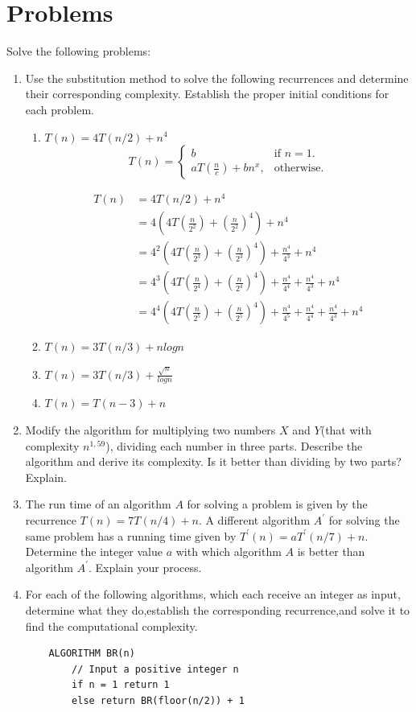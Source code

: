 \documentclass{article}
\begin{document}
\section{Problems}
Solve the following problems:
\begin{enumerate}
    \item Use  the  substitution  method  to  solve  the  following  recurrences  and  determine  their  corresponding complexity. Establish the proper initial conditions for each problem.
    \begin{enumerate}
        \item $T(n) = 4T(n/2) +n^4$
        \begin{equation*}
            T(n)=\begin{cases}
              b & \text{if $n = 1$}.\\
              aT(\frac{n}{c}) + bn^x, & \text{otherwise}.
            \end{cases}
        \end{equation*}

        \begin{align*}
            T(n) &= 4 T(n/2) + n^4\\
            &= 4(4T(\frac{n}{2^2}) + (\frac{n}{2^2})^4) + n^4\\
            &= 4^2(4T(\frac{n}{2^3}) + (\frac{n}{2^3})^4 )+ \frac{n^4}{4^3} + n^4\\
            &= 4^3(4T(\frac{n}{2^4}) + (\frac{n}{2^4})^4)+ \frac{n^4}{4^4} + \frac{n^4}{4^3} + n^4\\
            &= 4^4(4T(\frac{n}{2^5}) + (\frac{n}{2^5})^4)+ \frac{n^4}{4^5} + \frac{n^4}{4^4} + \frac{n^4}{4^3} + n^4
        \end{align*}

        \item $T(n) = 3T(n/3) + nlogn$
        \item $T(n) = 3T(n/3) + \frac{\sqrt{n}}{logn}$
        \item $T(n) = T(n - 3) +n$
    \end{enumerate}
    \item  Modify the algorithm for multiplying two numbers $X$ and $Y$(that with complexity $n^{1,59}$), dividing each number in three parts. Describe the algorithm and derive its complexity. Is it better than dividing by two parts? Explain.
    \item The run time of an algorithm $A$ for solving a problem is given by the recurrence $T(n) = 7T(n/4) + n.$ A different algorithm $A^{\prime}$ for solving the same problem has a running time given by $T^{\prime}(n) =aT^{\prime}(n/7) +n$. Determine  the  integer  value $a$ with  which  algorithm $A$ is  better  than  algorithm $A^{\prime}$.  Explain  your process.
    \item For each of the following algorithms, which each receive an integer as input, determine what they do,establish the corresponding recurrence,and solve it to find the computational complexity.
    \begin{lstlisting}
    ALGORITHM BR(n)
        // Input a positive integer n
        if n = 1 return 1
        else return BR(floor(n/2)) + 1
    \end{lstlisting}


\end{enumerate}
\end{document}
